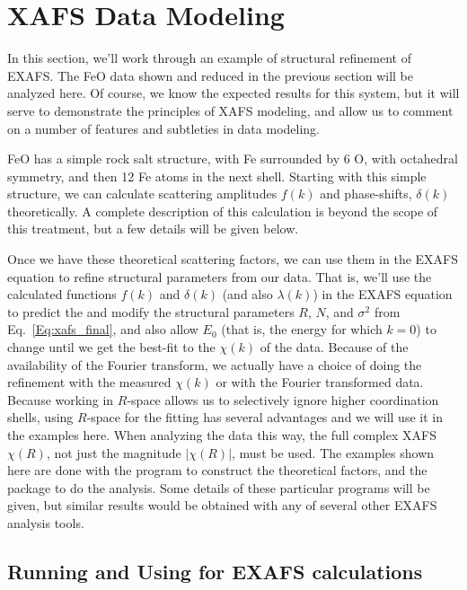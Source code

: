 \section{XAFS Data Modeling}\label{sect:modeling}

In this section, we'll work through an example of structural refinement of
EXAFS. The FeO data shown and reduced in the previous section will be
analyzed here.  Of course, we know the expected results for this system,
but it will serve to demonstrate the principles of XAFS modeling, and allow
us to comment on a number of features and subtleties in data modeling.

FeO has a simple rock salt structure, with Fe surrounded by 6 O, with
octahedral symmetry, and then 12 Fe atoms in the next shell.  Starting with
this simple structure, we can calculate scattering amplitudes $f(k)$ and
phase-shifts, $\delta(k)$ theoretically. A complete description of this
calculation is beyond the scope of this treatment, but a few details will be
given below.

Once we have these theoretical scattering factors, we can use them in the
EXAFS equation to refine structural parameters from our data.  That is,
we'll use the calculated functions $f(k)$ and $\delta(k)$ (and also
$\lambda(k)$) in the EXAFS equation to predict the and modify the
structural parameters $R$, $N$, and $\sigma^2$ from
Eq.~\ref{Eq:xafs_final}, and also allow $E_0$ (that is, the energy for
which $k=0$) to change until we get the best-fit to the $\chi(k)$ of the
data.  Because of the availability of the Fourier transform, we actually
have a choice of doing the refinement with the measured $\chi(k)$ or with
the Fourier transformed data.  Because working in $R$-space allows us to
selectively ignore higher coordination shells, using $R$-space for the
fitting has several advantages and we will use it in the examples here.
When analyzing the data this way, the full complex XAFS $\chi(R)$, not just
the magnitude $|\chi(R)|$, must be used.  The examples shown here are done
with the {\feff}\cite{feff6} program to construct the theoretical factors,
and the {\ifeffit}\cite{ifeffit} package to do the analysis.  Some details
of these particular programs will be given, but similar results would be
obtained with any of several other EXAFS analysis tools.

\subsection{Running and Using {\feff} for EXAFS calculations}

